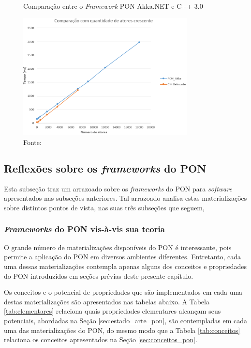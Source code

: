 \begin{figure}[!htb]
  \centering
  \caption{Comparação entre o \textit{Framework} PON Akka.NET e C++ 3.0}
  \includegraphics[width=0.8\textwidth]{../figures/result_akka.png}
  \smallskip
  \caption*{Fonte: }
  \label{fig:result_akka}
\end{figure}

\subsection{Reflexões sobre os \textit{frameworks} do PON}\label{sec:reflex}

Esta subseção traz um arrazoado sobre os \textit{frameworks} do PON para
\textit{software} apresentados nas subseções anteriores. Tal arrazoado analisa
estas materializações sobre distintos pontos de vista, nas suas três subseções
que seguem,

\subsubsection{\textit{Frameworks} do PON vis-à-vis sua teoria}

O grande número de materializações disponíveis do PON é interessante, pois
permite a aplicação do PON em diversos ambientes diferentes. Entretanto, cada
uma dessas materializações contempla apenas alguns dos conceitos e propriedades
do PON introduzidos em seções prévias deste presente capítulo.

Os conceitos e o potencial de propriedades que são implementados em cada uma
destas materializações são apresentados nas tabelas abaixo. A Tabela
\ref{tab:elementares} relaciona quais propriedades elementares alcançam seus
potenciais, abordadas na Seção \ref{sec:estado_arte_pon}, são contempladas em
cada uma das materializações do PON, do mesmo modo que a Tabela
\ref{tab:conceitos} relaciona os conceitos apresentados na Seção
\ref{sec:conceitos_pon}. 

